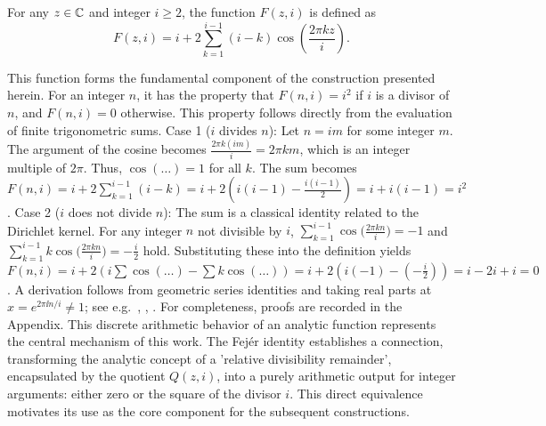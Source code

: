 \begin{definition}
For any $z \in \mathbb{C}$ and integer $i \ge 2$, the function $F(z,i)$ is defined as
\[F(z,i) = i+2\sum_{k=1}^{i-1}(i-k)\cos\left(\frac{2\pi k z}{i}\right).\]
\end{definition}
This function forms the fundamental component of the construction presented herein. For an integer $n$, it has the property that $F(n,i) = i^2$ if $i$ is a divisor of $n$, and $F(n,i) = 0$ otherwise. This property follows directly from the evaluation of finite trigonometric sums.
Case 1 ($i$ divides $n$): Let $n=im$ for some integer $m$. The argument of the cosine becomes $\frac{2\pi k (im)}{i} = 2\pi km$, which is an integer multiple of $2\pi$. Thus, $\cos(\dots)=1$ for all $k$. The sum becomes $F(n,i) = i + 2\sum_{k=1}^{i-1}(i-k) = i + 2\left(i(i-1) - \frac{i(i-1)}{2}\right) = i + i(i-1) = i^2$.
Case 2 ($i$ does not divide $n$): The sum is a classical identity related to the Dirichlet kernel. For any integer $n$ not divisible by $i$, $\sum_{k=1}^{i-1} \cos\!\bigl(\frac{2\pi kn}{i}\bigr) = -1$ and $\sum_{k=1}^{i-1} k \cos\!\bigl(\frac{2\pi kn}{i}\bigr) = -\frac{i}{2}$ hold. Substituting these into the definition yields $F(n,i) = i + 2\left(i\sum \cos(\dots) - \sum k\cos(\dots)\right) = i + 2(i(-1) - (-\frac{i}{2})) = i - 2i + i = 0$. A derivation follows from geometric series identities and taking real parts at $x=e^{2\pi \ii n/i}\neq 1$; see e.g.~\cite[Ch.~3]{davenport2000}, \cite[Ch.~I]{zygmund2002}, \cite[Ch.~I]{montgomeryvaughan2007}. For completeness, proofs are recorded in the Appendix.
This discrete arithmetic behavior of an analytic function represents the central mechanism of this work. The Fej\'er identity establishes a connection, transforming the analytic concept of a 'relative divisibility remainder', encapsulated by the quotient $Q(z,i)$, into a purely arithmetic output for integer arguments: either zero or the square of the divisor $i$. This direct equivalence motivates its use as the core component for the subsequent constructions.


